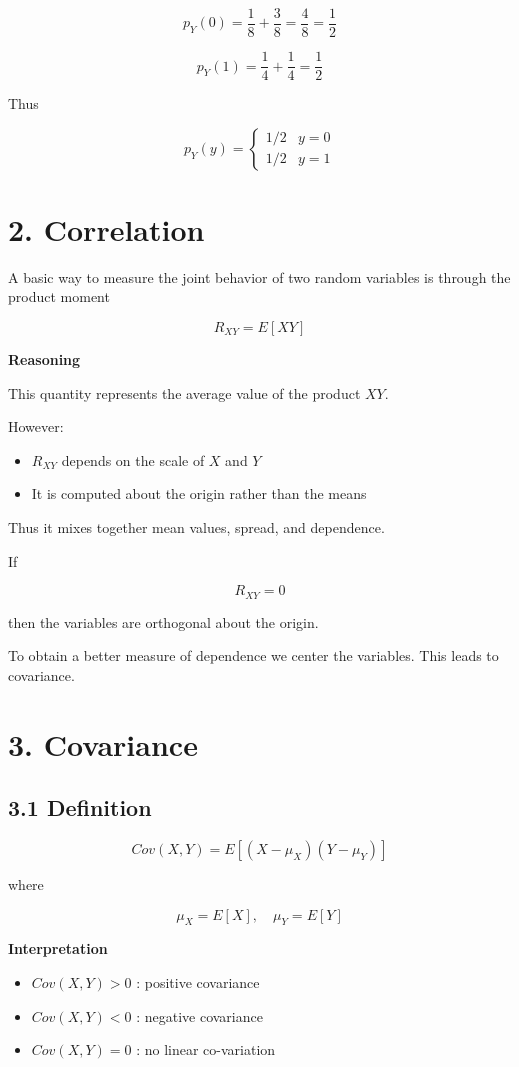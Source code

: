 \documentclass[12pt]{article}
\begin{document}
\[
p_Y(0)=\frac{1}{8}+\frac{3}{8}=\frac{4}{8}=\frac{1}{2}
\]

\[
p_Y(1)=\frac{1}{4}+\frac{1}{4}=\frac{1}{2}
\]

Thus

\[
p_Y(y)=
\begin{cases}
1/2 & y=0 \\
1/2 & y=1
\end{cases}
\]

\section*{2. Correlation}

A basic way to measure the joint behavior of two random variables is through the product moment

\[
R_{XY}=E[XY]
\]

\textbf{Reasoning}

This quantity represents the average value of the product $XY$.

However:

\begin{itemize}
\item $R_{XY}$ depends on the scale of $X$ and $Y$
\item It is computed about the origin rather than the means
\end{itemize}

Thus it mixes together mean values, spread, and dependence.

If

\[
R_{XY}=0
\]

then the variables are orthogonal about the origin.

To obtain a better measure of dependence we center the variables. This leads to covariance.

\section*{3. Covariance}

\subsection*{3.1 Definition}

\[
Cov(X,Y)=E[(X-\mu_X)(Y-\mu_Y)]
\]

where

\[
\mu_X=E[X], \quad \mu_Y=E[Y]
\]

\textbf{Interpretation}

\begin{itemize}
\item $Cov(X,Y)>0$ : positive covariance
\item $Cov(X,Y)<0$ : negative covariance
\item $Cov(X,Y)=0$ : no linear co-variation
\end{itemize}
\end{document}

